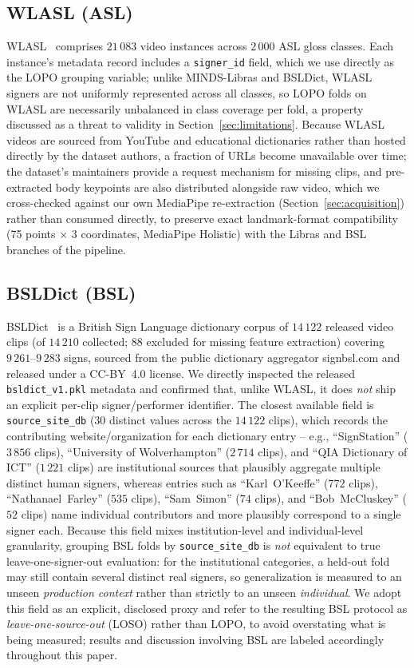 \documentclass[journal]{IEEEtran}
\begin{document}
\subsection{WLASL (ASL)}
WLASL~\cite{wlasl2020} comprises $21\,083$ video instances across $2\,000$ ASL gloss classes. Each instance's metadata record includes a \texttt{signer\_id} field, which we use directly as the LOPO grouping variable; unlike MINDS-Libras and BSLDict, WLASL signers are not uniformly represented across all classes, so LOPO folds on WLASL are necessarily unbalanced in class coverage per fold, a property discussed as a threat to validity in Section~\ref{sec:limitations}. Because WLASL videos are sourced from YouTube and educational dictionaries rather than hosted directly by the dataset authors, a fraction of URLs become unavailable over time; the dataset's maintainers provide a request mechanism for missing clips, and pre-extracted body keypoints are also distributed alongside raw video, which we cross-checked against our own MediaPipe re-extraction (Section~\ref{sec:acquisition}) rather than consumed directly, to preserve exact landmark-format compatibility (75 points $\times$ 3 coordinates, MediaPipe Holistic) with the Libras and BSL branches of the pipeline.

\subsection{BSLDict (BSL)}
BSLDict~\cite{momeni2020bsldict} is a British Sign Language dictionary corpus of $14\,122$ released video clips (of $14\,210$ collected; $88$ excluded for missing feature extraction) covering $9\,261$--$9\,283$ signs, sourced from the public dictionary aggregator signbsl.com and released under a CC-BY~4.0 license. We directly inspected the released \texttt{bsldict\_v1.pkl} metadata and confirmed that, unlike WLASL, it does \emph{not} ship an explicit per-clip signer/performer identifier. The closest available field is \texttt{source\_site\_db} ($30$ distinct values across the $14\,122$ clips), which records the contributing website/organization for each dictionary entry -- e.g., ``SignStation'' ($3\,856$ clips), ``University of Wolverhampton'' ($2\,714$ clips), and ``QIA Dictionary of ICT'' ($1\,221$ clips) are institutional sources that plausibly aggregate multiple distinct human signers, whereas entries such as ``Karl~O'Keeffe'' ($772$ clips), ``Nathanael~Farley'' ($535$ clips), ``Sam~Simon'' ($74$ clips), and ``Bob~McCluskey'' ($52$ clips) name individual contributors and more plausibly correspond to a single signer each. Because this field mixes institution-level and individual-level granularity, grouping BSL folds by \texttt{source\_site\_db} is \emph{not} equivalent to true leave-one-signer-out evaluation: for the institutional categories, a held-out fold may still contain several distinct real signers, so generalization is measured to an unseen \emph{production context} rather than strictly to an unseen \emph{individual}. We adopt this field as an explicit, disclosed proxy and refer to the resulting BSL protocol as \emph{leave-one-source-out} (LOSO) rather than LOPO, to avoid overstating what is being measured; results and discussion involving BSL are labeled accordingly throughout this paper.
\end{document}
